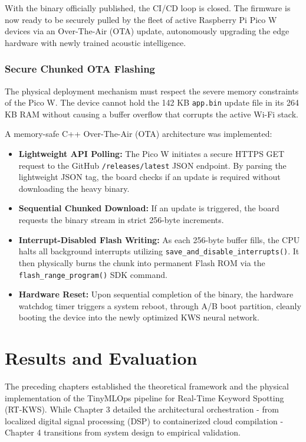 \documentclass[11pt,a4paper,openany]{book}
\begin{document}
With the binary officially published, the CI/CD loop is closed. The firmware is now ready to be securely pulled by the fleet of active Raspberry Pi Pico W devices via an Over-The-Air (OTA) update, autonomously upgrading the edge hardware with newly trained acoustic intelligence.

\subsection{Secure Chunked OTA Flashing}
The physical deployment mechanism must respect the severe memory constraints of the Pico W. The device cannot hold the 142 KB \texttt{app.bin} update file in its 264 KB RAM without causing a buffer overflow that corrupts the active Wi-Fi stack.

A memory-safe C++ Over-The-Air (OTA) architecture was implemented:
\begin{itemize}
    \item \textbf{Lightweight API Polling:} The Pico W initiates a secure HTTPS GET request to the GitHub \texttt{/releases/latest} JSON endpoint. By parsing the lightweight JSON tag, the board checks if an update is required without downloading the heavy binary.
    \item \textbf{Sequential Chunked Download:} If an update is triggered, the board requests the binary stream in strict 256-byte increments.
    \item \textbf{Interrupt-Disabled Flash Writing:} As each 256-byte buffer fills, the CPU halts all background interrupts utilizing \texttt{save\_and\_disable\_interrupts()}. It then physically burns the chunk into permanent Flash ROM via the \texttt{flash\_range\_program()} SDK command.
    \item \textbf{Hardware Reset:} Upon sequential completion of the binary, the hardware watchdog timer triggers a system reboot, through A/B boot partition, cleanly booting the device into the newly optimized KWS neural network.
\end{itemize}

\chapter{Results and Evaluation}

The preceding chapters established the theoretical framework and the physical implementation of the TinyMLOps pipeline for Real-Time Keyword Spotting (RT-KWS). While Chapter 3 detailed the architectural orchestration - from localized digital signal processing (DSP) to containerized cloud compilation - Chapter 4 transitions from system design to empirical validation.
\end{document}

